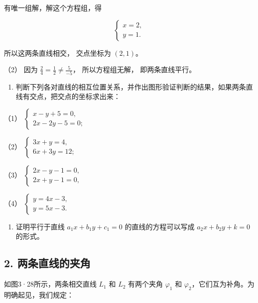 有唯一组解，解这个方程组，得

\[
\left\{ \begin{array}{l} x = 2, \\ y = 1. \end{array} \right.
\]

所以这两条直线相交， 交点坐标为 \((2, 1)\)。

（2） 因为 \(\frac{2}{4} = \frac{1}{2} \neq \frac{5}{-5}\)，
所以方程组无解， 即两条直线平行。

\begin{enumerate}
\def\labelenumi{\arabic{enumi}.}
\tightlist
\item
  判断下列各对直线的相互位置关系，并作出图形验证判断的结果，如果两条直线有交点，把交点的坐标求出来：
\end{enumerate}

（1）
\(\left\{ \begin{array}{l} x - y + 5 = 0, \\ 2x - 2y - 5 = 0; \end{array} \right.\)

（2）
\(\left\{ \begin{array}{l} 3x + y = 4, \\ 6x + 3y = 12; \end{array} \right.\)

（3）
\(\left\{ \begin{array}{l} 2x - y - 1 = 0, \\ 2x + y - 1 = 0, \end{array} \right.\)

（4）
\(\left\{ \begin{array}{l} y = 4x - 3, \\ y = 5x - 3. \end{array} \right.\)

\begin{enumerate}
\def\labelenumi{\arabic{enumi}.}
\setcounter{enumi}{1}
\tightlist
\item
  证明平行于直线 \(a_1x + b_1y + c_1 = 0\) 的直线的方程可以写成
  \(a_2x + b_2y + k = 0\) 的形式。
\end{enumerate}

\subsection{2.
两条直线的夹角}\label{ux4e24ux6761ux76f4ux7ebfux7684ux5939ux89d2}

如图3·28所示，两条相交直线 \(L_{1}\) 和 \(L_{2}\) 有两个夹角
\(\varphi_{1}\) 和 \(\varphi_{2}\)，它们互为补角。为明确起见，我们规定：

